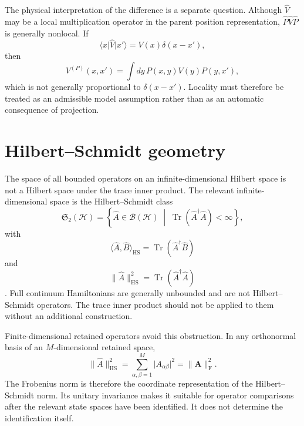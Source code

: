 The physical interpretation of the difference is a separate question.
Although $\hat V$ may be a local multiplication operator in the parent
position representation, $\hat P\hat V\hat P$ is generally nonlocal. If
\begin{equation}
    \langle x\rvert\hat V\lvert x'\rangle
    =
    V(x)\delta(x-x'),
\end{equation}
then
\begin{equation}
    V^{(P)}(x,x')
    =
    \int dy\,
    P(x,y)V(y)P(y,x'),
\end{equation}
which is not generally proportional to $\delta(x-x')$. Locality must therefore
be treated as an admissible model assumption rather than as an automatic
consequence of projection.

\section*{Hilbert--Schmidt geometry}

The space of all bounded operators on an infinite-dimensional Hilbert space is
not a Hilbert space under the trace inner product. The relevant
infinite-dimensional space is the Hilbert--Schmidt class
\begin{equation}
    \mathfrak S_2(\mathcal H)
    =
    \left\{
        \hat A\in\mathcal B(\mathcal H)
        \;\middle|\;
        \operatorname{Tr}(\hat A^\dagger\hat A)<\infty
    \right\},
\end{equation}
with
\begin{equation}
    \langle\hat A,\hat B\rangle_{\mathrm{HS}}
    =
    \operatorname{Tr}(\hat A^\dagger\hat B)
\end{equation}
and
\begin{equation}
    \lVert\hat A\rVert_{\mathrm{HS}}^2
    =
    \operatorname{Tr}(\hat A^\dagger\hat A)
\end{equation}
\cite{simon2005}. Full continuum Hamiltonians are generally unbounded and are
not Hilbert--Schmidt operators. The trace inner product should not be applied
to them without an additional construction.

Finite-dimensional retained operators avoid this obstruction. In any
orthonormal basis of an $M$-dimensional retained space,
\begin{equation}
    \lVert\hat A\rVert_{\mathrm{HS}}^2
    =
    \sum_{\alpha,\beta=1}^{M}
    \lvert A_{\alpha\beta}\rvert^2
    =
    \lVert\mathbf A\rVert_{\mathrm F}^2.
\end{equation}
The Frobenius norm is therefore the coordinate representation of the
Hilbert--Schmidt norm. Its unitary invariance makes it suitable for operator
comparisons after the relevant state spaces have been identified. It does not
determine the identification itself.

